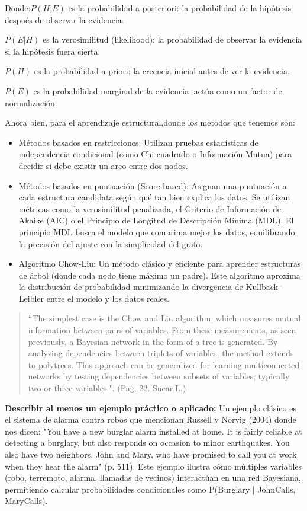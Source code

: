 \documentclass[letterpaper,12pt]{article}
\begin{document}
\begin{itemize}
    Donde:$P(H|E)$ es la probabilidad a posteriori: la probabilidad de la hipótesis después de observar la evidencia.
    
    $P(E|H)$ es la verosimilitud (likelihood): la probabilidad de observar la evidencia si la hipótesis fuera cierta.
    
    $P(H)$ es la probabilidad a priori: la creencia inicial antes de ver la evidencia.
    
    $P(E)$ es la probabilidad marginal de la evidencia: actúa como un factor de normalización.

    Ahora bien, para el aprendizaje estructural,donde los metodos que tenemos son:

    \begin{itemize}
        \item Métodos basados en restricciones: Utilizan pruebas estadísticas de independencia condicional (como Chi-cuadrado o Información Mutua) para decidir si debe existir un arco entre dos nodos.
        \item Métodos basados en puntuación (Score-based): Asignan una puntuación a cada estructura candidata según qué tan bien explica los datos. Se utilizan métricas como la verosimilitud penalizada, el Criterio de Información de Akaike (AIC) o el Principio de Longitud de Descripción Mínima (MDL). El principio MDL busca el modelo que comprima mejor los datos, equilibrando la precisión del ajuste con la simplicidad del grafo.
        \item Algoritmo Chow-Liu: Un método clásico y eficiente para aprender estructuras de árbol (donde cada nodo tiene máximo un padre). Este algoritmo aproxima la distribución de probabilidad minimizando la divergencia de Kullback-Leibler entre el modelo y los datos reales.
    \end{itemize}
    \newpage
    \begin{quote}
        ``The simplest case is the Chow and Liu algorithm, which measures mutual information between pairs of variables. From these measurements, as seen previously, a Bayesian network in the form of a tree is generated. By analyzing dependencies between triplets of variables, the method extends to polytrees. This approach can be generalized for learning multiconnected networks by testing dependencies between subsets of variables, typically two or three variables.". (Pag. 22. Sucar,L.)
    \end{quote}

    \textbf{Describir al menos un ejemplo práctico o aplicado:}
    Un ejemplo clásico es el sistema de alarma contra robos que mencionan Russell y Norvig (2004) donde nos dicen: "You have a new burglar alarm installed at home. It is fairly reliable at detecting a burglary, but also responds on occasion to minor earthquakes. You also have two neighbors, John and Mary, who have promised to call you at work when they hear the alarm" (p. 511).
    Este ejemplo ilustra cómo múltiples variables (robo, terremoto, alarma, llamadas de vecinos) interactúan en una red Bayesiana, permitiendo calcular probabilidades condicionales como P(Burglary | JohnCalls, MaryCalls).


\end{itemize}
\end{document}
